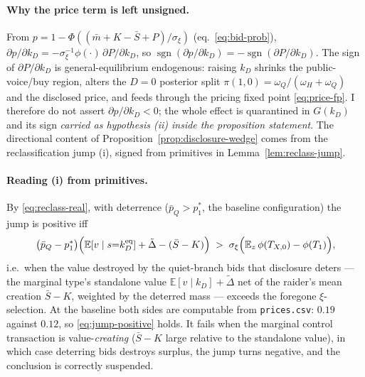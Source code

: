 \documentclass[11pt]{article}
\newcommand{\E}{\mathbb{E}}
\newcommand{\1}{\mathbf{1}}
\begin{document}
\paragraph{Why the price term is left unsigned.}
From $p=1-\Phi((\bar m+K-\bar S+P)/\sigma_\xi)$ (eq.~\eqref{eq:bid-prob}),
$\partial p/\partial k_D=-\sigma_\xi^{-1}\phi(\cdot)\,\partial P/\partial k_D$, so
$\operatorname{sgn}(\partial p/\partial k_D)=-\operatorname{sgn}(\partial P/
\partial k_D)$. The sign of $\partial P/\partial k_D$ is general-equilibrium
endogenous: raising $k_D$ shrinks the public-voice/buy region, alters the $D{=}0$
posterior split $\pi(1,0)=\omega_Q/(\omega_H+\omega_Q)$ and the disclosed price,
and feeds through the pricing fixed point \eqref{eq:price-fp}. I therefore do not
assert $\partial p/\partial k_D<0$; the whole effect is quarantined in $G(k_D)$
and its sign \emph{carried as hypothesis (ii) inside the proposition statement}.
The directional content of Proposition~\ref{prop:disclosure-wedge} comes from the
reclassification jump (i), signed from primitives in
Lemma~\ref{lem:reclass-jump}.

\paragraph{Reading (i) from primitives.}
By \eqref{eq:reclass-real}, with deterrence ($\bar p_Q>p_1^{\ast}$, the baseline
configuration) the jump is positive iff
\begin{equation}
\bigl(\bar p_Q-p_1^{\ast}\bigr)
 \Bigl(\E[v\mid s{=}k_D^{\textup{eq}}]+\tilde\Delta-(\bar S-K)\Bigr)
 \;>\;\sigma_\xi\Bigl(\E_z\,\phi(T_{X,0})-\phi(T_1)\Bigr),
\label{eq:jump-positive}
\end{equation}
i.e.\ when the value destroyed by the quiet-branch bids that disclosure deters
--- the marginal type's standalone value $\E[v\mid k_D]+\tilde\Delta$ net of the
raider's mean creation $\bar S-K$, weighted by the deterred mass --- exceeds the
foregone $\xi$-selection. At the baseline both sides are computable from
\texttt{prices.csv}: $0.19$ against $0.12$, so \eqref{eq:jump-positive} holds.
It fails when the marginal control transaction is value-\emph{creating}
($\bar S-K$ large relative to the standalone value), in which case deterring
bids destroys surplus, the jump turns negative, and the conclusion is correctly
suspended.
\end{document}
